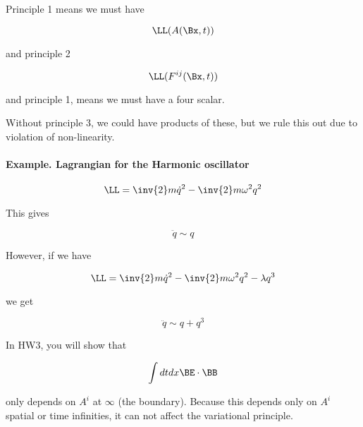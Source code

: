 Principle 1 means we must have 

\begin{equation}\label{eqn:relativisticElectrodynamicsL12b:230}
\LL(A(\Bx, t))
\end{equation}

and principle 2

\begin{equation}\label{eqn:relativisticElectrodynamicsL12b:250}
\LL(F^{ij}(\Bx, t))
\end{equation}

and principle 1, means we must have a four scalar.

Without principle 3, we could have products of these, but we rule this out due to violation of non-linearity.

\paragraph{Example.  Lagrangian for the Harmonic oscillator}

\begin{equation}\label{eqn:relativisticElectrodynamicsL12b:270}
\LL = \inv{2} m \dot{q}^2 - \inv{2} m \omega^2 q^2 
\end{equation}

This gives 

\begin{equation}\label{eqn:relativisticElectrodynamicsL12b:290}
\ddot{q} \sim q
\end{equation}

However, if we have

\begin{equation}\label{eqn:relativisticElectrodynamicsL12b:310}
\LL = \inv{2} m \dot{q}^2 - \inv{2} m \omega^2 q^2 - \lambda q^3
\end{equation}

we get

\begin{equation}\label{eqn:relativisticElectrodynamicsL12b:330}
\ddot{q} \sim q + q^3
\end{equation}

In HW3, you will show that 

\begin{equation}\label{eqn:relativisticElectrodynamicsL12b:350}
\int dt dx \BE \cdot \BB
\end{equation}

only depends on \(A^i\) at \(\infty\) (the boundary).  Because this depends only on \(A^i\) spatial or time infinities, it can not affect the variational principle.

